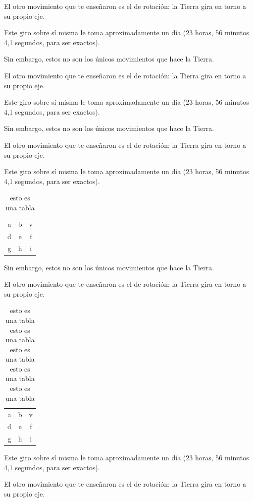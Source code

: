 \documentclass{report}
\begin{document}
El otro movimiento que te enseñaron es el de rotación: la Tierra gira en torno a su propio eje.

Este giro sobre sí misma le toma aproximadamente un día (23 horas, 56 minutos 4,1 segundos, para ser exactos). 

Sin embargo, estos no son los únicos movimientos que hace la Tierra.

El otro movimiento que te enseñaron es el de rotación: la Tierra gira en torno a su propio eje.

Este giro sobre sí misma le toma aproximadamente un día (23 horas, 56 minutos 4,1 segundos, para ser exactos). 

Sin embargo, estos no son los únicos movimientos que hace la Tierra.

El otro movimiento que te enseñaron es el de rotación: la Tierra gira en torno a su propio eje.

Este giro sobre sí misma le toma aproximadamente un día (23 horas, 56 minutos 4,1 segundos, para ser exactos). 

\begin{table}[H]
	\centering
	\caption{esto es una tabla}
	\begin{tabular}{|cc|c}
		\hline
		a & b & v \\
		d & e & f \\
		g & h & i \\
		\hline
	\end{tabular}
\end{table}

Sin embargo, estos no son los únicos movimientos que hace la Tierra.


El otro movimiento que te enseñaron es el de rotación: la Tierra gira en torno a su propio eje.

\begin{table}[H]
	\centering
	\caption{esto es una tabla esto es una tabla esto es una tabla esto es una tabla esto es una tabla}
	\begin{tabular}{|cc|c}
		\hline
		a & b & v \\
		d & e & f \\
		g & h & i \\
		\hline
	\end{tabular}
\end{table}

Este giro sobre sí misma le toma aproximadamente un día (23 horas, 56 minutos 4,1 segundos, para ser exactos). 

El otro movimiento que te enseñaron es el de rotación: la Tierra gira en torno a su propio eje.
\end{document}
